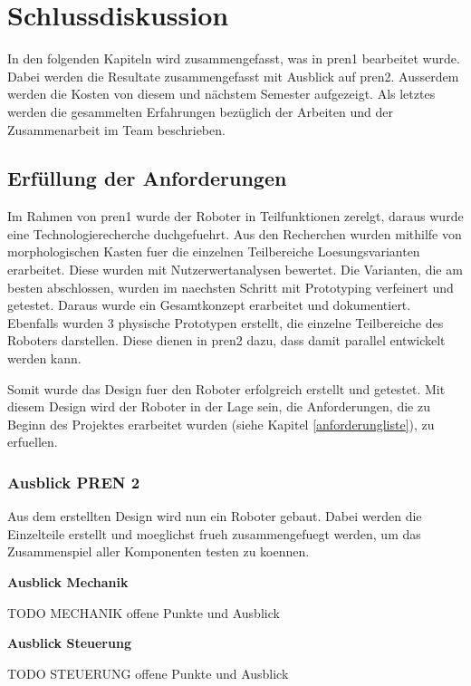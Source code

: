 \section{Schlussdiskussion}

In den folgenden Kapiteln wird zusammengefasst, was in \acrshort{pren1} bearbeitet wurde.
Dabei werden die Resultate zusammengefasst mit Ausblick auf \acrshort{pren2}.
Ausserdem werden die Kosten von diesem und nächstem Semester aufgezeigt.
Als letztes werden die gesammelten Erfahrungen bezüglich der Arbeiten und der Zusammenarbeit im Team beschrieben.

\subsection{Erfüllung der Anforderungen}

Im Rahmen von \acrshort{pren1} wurde der Roboter in Teilfunktionen zerelgt, daraus wurde eine Technologierecherche duchgefuehrt. Aus den Recherchen wurden mithilfe von morphologischen Kasten fuer die einzelnen Teilbereiche Loesungsvarianten erarbeitet. Diese wurden mit Nutzerwertanalysen bewertet. Die Varianten, die am besten abschlossen, wurden im naechsten Schritt mit Prototyping verfeinert und getestet. Daraus wurde ein Gesamtkonzept erarbeitet und dokumentiert. Ebenfalls wurden 3 physische Prototypen erstellt, die einzelne Teilbereiche des Roboters darstellen. Diese dienen in \acrshort{pren2} dazu, dass damit parallel entwickelt werden kann.

Somit wurde das Design fuer den Roboter erfolgreich erstellt und getestet. Mit diesem Design wird der Roboter in der Lage sein, die Anforderungen, die zu Beginn des Projektes erarbeitet wurden (siehe Kapitel \ref{anforderungliste}), zu erfuellen.

\subsubsection{Ausblick PREN 2}

Aus dem erstellten Design wird nun ein Roboter gebaut. Dabei werden die Einzelteile erstellt und moeglichst frueh zusammengefuegt werden, um das Zusammenspiel aller Komponenten testen zu koennen.

\textbf{Ausblick Mechanik}

TODO MECHANIK offene Punkte und Ausblick

\textbf{Ausblick Steuerung}

TODO STEUERUNG offene Punkte und Ausblick

